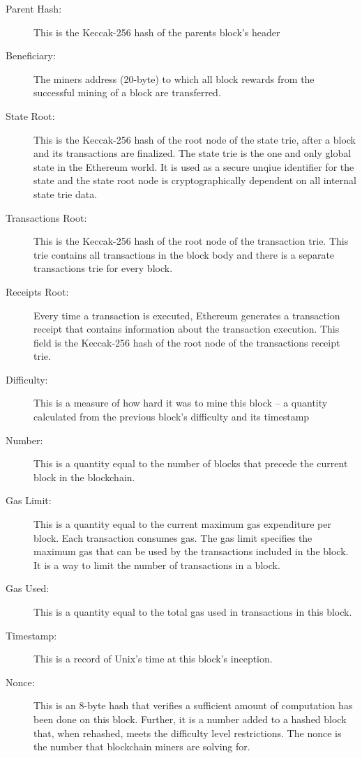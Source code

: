 \begin{description}
	\item[Parent Hash:] This is the Keccak-256 hash of the parents block's header
	\item[Beneficiary:] The miners address (20-byte) to which all block rewards from the successful mining of a block are transferred.
	\item[State Root:] This is the Keccak-256 hash of the root node of the state trie, after a block and its transactions are finalized. The state trie is the one and only global state in the Ethereum world. It is used as a secure unqiue identifier for the state and the state root node is cryptographically dependent on all internal state trie data.
	\item[Transactions Root:] This is the Keccak-256 hash of the root node of the transaction trie. This trie contains all transactions in the block body and there is a separate transactions trie for every block.
	\item[Receipts Root:] Every time a transaction is executed, Ethereum generates a transaction receipt that contains information about the transaction execution. This field is the Keccak-256 hash of the root node of the transactions receipt trie.
	\item[Difficulty:] This is a measure of how hard it was to mine this block – a quantity calculated from the previous block’s difficulty and its timestamp
	\item[Number:] This is a quantity equal to the number of blocks that precede the current block in the blockchain.
	\item[Gas Limit:] This is a quantity equal to the current maximum gas expenditure per block. Each transaction consumes gas. The gas limit specifies the maximum gas that can be used by the transactions included in the block. It is a way to limit the number of transactions in a block.
	\item[Gas Used:] This is a quantity equal to the total gas used in transactions in this block.
	\item[Timestamp:] This is a record of Unix’s time at this block’s inception.
	\item[Nonce:] This is an 8-byte hash that verifies a sufficient amount of computation has been done on this block. Further, it is a number added to a hashed block that, when rehashed, meets the difficulty level restrictions. The nonce is the number that blockchain miners are solving for.
\end{description}
